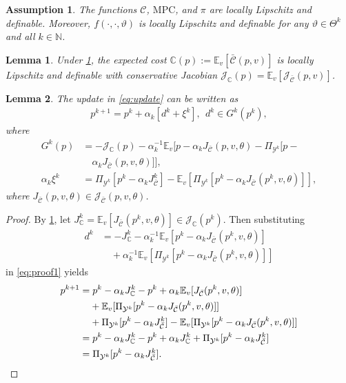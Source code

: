 \documentclass[10pt,a4paper]{amsart}
\newtheorem{assumption}{Assumption}
\newtheorem{lemma}{Lemma}
\newcommand{\C}{\mathbb{C}}
\newcommand{\Cb}{{\bar{\mathcal{C}}}}
\newcommand{\E}{\mathbb{E}}
\newcommand{\J}{\mathcal{J}}
\newcommand{\N}{\mathbb{N}}
\begin{document}
\begin{assumption}\label{ass:local_lip_and_definability}
The functions $\mathcal{C}$, $\text{MPC}$, and $\pi$ are locally Lipschitz and definable. Moreover, $f(\cdot,\cdot,\vartheta)$ is locally Lipschitz and definable for any $\vartheta\in \Theta^k$ and all $k\in\N$.
\end{assumption}

\begin{lemma}\label{lemma:exchange_diff_and_exp}
Under \cref{ass:local_lip_and_definability}, the expected cost $\C(p):=\E_v[\Cb(p,v)]$ is locally Lipschitz and definable with conservative Jacobian $\J_\C(p)=\E_v[\J_\Cb(p,v)]$.
\end{lemma}

\begin{lemma}
The update in \cref{eq:update} can be written as
\begin{align}\label{eq:proof1}
p^{k+1}= p^k+\alpha_k [d^k + \xi^k],~~ d^k\in G^k(p^k),
\end{align}
where
\begin{align*}
G^k(p) & = - \J_{\C}(p) - \alpha_k^{-1}\E_v[p-\alpha_k J_\Cb(p,v,\theta) - \Pi_{\mathcal{Y}^k}[p - \\ & \quad \alpha_k J_\Cb(p,v,\theta)]],\\
\alpha_k \xi^k & = \Pi_{\mathcal{Y}^k}[p^k-\alpha_k J_\Cb^k] - \E_v[\Pi_{\mathcal{Y}^k}[p^k-\alpha_k J_\Cb(p^k,v,\theta)]],
\end{align*}
where $J_\Cb(p,v,\theta)\in\J_\Cb(p,v,\theta)$.
\end{lemma}

\begin{proof}
By \cref{lemma:exchange_diff_and_exp}, let $J_\C^k = \mathbb{E}_v[J_\Cb(p^k,v,\theta)] \in \J_\C(p^k)$. Then substituting
\begin{align*}
d^k & = - J_\C^k-\alpha_k^{-1}\E_v[p^k-\alpha_k J_\Cb(p^k,v,\theta)] \\ & \quad + \alpha_k^{-1}\E_v[\Pi_{\mathcal{Y}^k}[p^k - \alpha_k J_\Cb(p^k,v,\theta)]]
\end{align*}
in \cref{eq:proof1} yields
\begin{align*}
p^{k+1} & =  p^k - \alpha_k J_\C^k - p^k + \alpha_k \E_v[J_\Cb(p^k,v,\theta)] \\ & \hphantom{={}} + \E_v[\Pi_{\mathcal{Y}^k}[p^k-\alpha_k J_\Cb(p^k,v,\theta)]] \\ & \hphantom{={}} + \Pi_{\mathcal{Y}^k}[p^k-\alpha_k J_\Cb^k] - \E_v[\Pi_{\mathcal{Y}^k}[p^k-\alpha_k J_\Cb(p^k,v,\theta)]] \\
%
& = p^k - \alpha_k J_\C^k - p^k + \alpha_k J_\C^k + \Pi_{\mathcal{Y}^k}[p^k-\alpha_k J_\Cb^k] \\
%
& = \Pi_{\mathcal{Y}^k}[p^k-\alpha_k J_\Cb^k ].\qedhere
\end{align*}
\end{proof}
\end{document}
